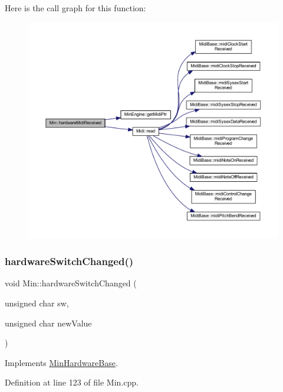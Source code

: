 Here is the call graph for this function\+:
\nopagebreak
\begin{figure}[H]
\begin{center}
\leavevmode
\includegraphics[width=350pt]{class_min_a8d4ebe4e020e14c2457d42f33c4c9e32_cgraph}
\end{center}
\end{figure}
\mbox{\label{class_min_ae00f275ac6aeb73f932e62ae85abe5b1}} 
\subsubsection{\texorpdfstring{hardware\+Switch\+Changed()}{hardwareSwitchChanged()}}
{\footnotesize\ttfamily void Min\+::hardware\+Switch\+Changed (\begin{DoxyParamCaption}\item[{unsigned char}]{sw,  }\item[{unsigned char}]{new\+Value }\end{DoxyParamCaption})\hspace{0.3cm}{\ttfamily [virtual]}}



Implements \hyperlink{class_min_hardware_base_a782fcaa265c084be39b509bd289dc42f}{Min\+Hardware\+Base}.



Definition at line 123 of file Min.\+cpp.


